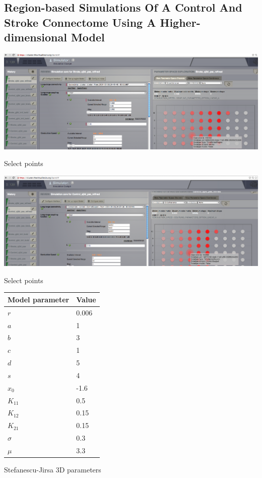 \documentclass{tufte-handout}
\begin{document}
\subsection{Region-based Simulations Of A Control And Stroke Connectome Using A Higher-dimensional Model}

\begin{marginfigure}%
  \includegraphics[width=0.82\linewidth]{Handout_UI_ModellingStructuralLesions_SelectPointFromPSE_a}
    \caption{Select points}
  \label{fig:steps_sim}
  \end{marginfigure}
  
  \begin{marginfigure}
\includegraphics[width=0.82\linewidth]{Handout_UI_ModellingStructuralLesions_SelectPointFromPSE_b}
  \caption{Select points}
  \label{fig:steps_sim_03}
\end{marginfigure}

\begin{margintable}
  \centering
  \selectfont
  \begin{tabular}{ll}
    \toprule
    Model parameter & Value \\
    \midrule
             $r$   & 0.006 \\
             $a$          &   1   \\
             $b$          &  3    \\
             $c$          &   1        \\
             $d$          &   5    \\
             $s$          &   4    \\
             $x_0$        &   -1.6        \\
             $K_{11}$     &   0.5        \\
             $K_{12}$     &   0.15     \\
             $K_{21}$     &   0.15       \\
             $\sigma$     &   0.3   \\
             $\mu$        &   3.3 \\
    \bottomrule
  \end{tabular}
  \caption{Stefanescu-Jirsa 3D parameters}
  \label{tab:modeltab}
\end{margintable}
\end{document}

